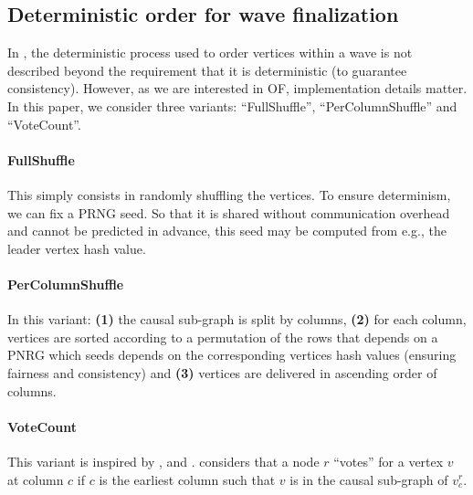 

\subsection{Deterministic order for wave finalization\label{ssec:deterministic_order}}


In \cite{all_you_need_is_dag,bullshark,narwhal_and_tusk}, the deterministic process used to order vertices within a wave is not described beyond the requirement that it is deterministic (to guarantee consistency).
However, as we are interested in OF, implementation details matter.
In this paper, we consider three variants: ``FullShuffle'', ``PerColumnShuffle'' and ``VoteCount''.



\paragraph{FullShuffle} This simply consists in randomly shuffling the vertices. 
To ensure determinism, we can fix a PRNG seed. So that it is shared without communication overhead and cannot be predicted in advance, this seed may be computed from e.g., the leader vertex hash value.


\paragraph{PerColumnShuffle} In this variant: \textbf{(1)} the causal sub-graph is split by columns, \textbf{(2)} for each column, vertices are sorted according to a permutation of the rows that depends on a PNRG which seeds depends on the corresponding vertices hash values (ensuring fairness and consistency) and \textbf{(3)} vertices are delivered in ascending order of columns.



\paragraph{VoteCount} This variant is inspired by \cite{reducing_latency_of_dag_based_consensus_in_the_asynchronous_setting_via_the_utxo_model}, \cite{themis_fast_strong_order_fairness_in_byzantine_consensus} and \cite{diversified_top_k_graph_pattern_matching}.
\cite{reducing_latency_of_dag_based_consensus_in_the_asynchronous_setting_via_the_utxo_model} considers that a node $r$ ``votes'' for a vertex $v$ at column $c$ if $c$ is the earliest column such that $v$ is in the causal sub-graph of $v_c^r$.

